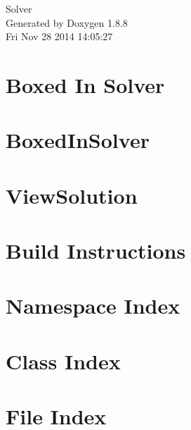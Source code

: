 \documentclass[twoside]{book}
\newcommand{\+}{\discretionary{\mbox{\scriptsize$\hookleftarrow$}}{}{}}
\newcommand{\clearemptydoublepage}{%
  \newpage{\pagestyle{empty}\cleardoublepage}%
}
\begin{document}
\hypersetup{pageanchor=false,
             bookmarks=true,
             bookmarksnumbered=true,
             pdfencoding=unicode
            }
\begin{titlepage}
\vspace*{7cm}
\begin{center}%
{\Large Solver }\\
\vspace*{1cm}
{\large Generated by Doxygen 1.8.8}\\
\vspace*{0.5cm}
{\small Fri Nov 28 2014 14:05:27}\\
\end{center}
\end{titlepage}
\clearemptydoublepage
\tableofcontents
\clearemptydoublepage
{}
\hypersetup{pageanchor=true}

\chapter{Boxed In Solver}
\label{index}\hypertarget{index}{}
\chapter{Boxed\+In\+Solver}
\label{boxedinsolver_page}
\hypertarget{boxedinsolver_page}{}

\chapter{View\+Solution}
\label{viewsolution_page}
\hypertarget{viewsolution_page}{}

\chapter{Build Instructions}
\label{build_instructions_page}
\hypertarget{build_instructions_page}{}

\chapter{Namespace Index}

\chapter{Class Index}

\chapter{File Index}

\end{document}
